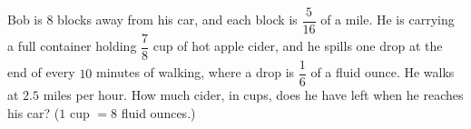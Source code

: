 Bob is $8$ blocks away from his car, and each block is $\dfrac{5}{16}$ of a mile. He is carrying a full container holding $\dfrac78$ cup of hot apple cider, and he spills one drop at the end of every $10$ minutes of walking, where a drop is $\dfrac16$ of a fluid ounce. He walks at $2.5$ miles per hour. How much cider, in cups, does he have left when he reaches his car? ($1$ cup $=8$ fluid ounces.)
